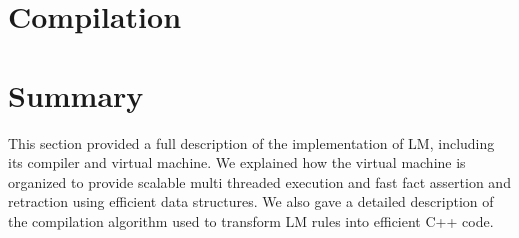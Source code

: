 


\section{Compilation}


\section{Summary}

This section provided a full description of the implementation of LM, including
its compiler and virtual machine. We explained how the virtual machine is
organized to provide scalable multi threaded execution and fast fact assertion
and retraction using efficient data structures. We also gave a detailed
description of the compilation algorithm used to transform LM rules into
efficient C++ code.
